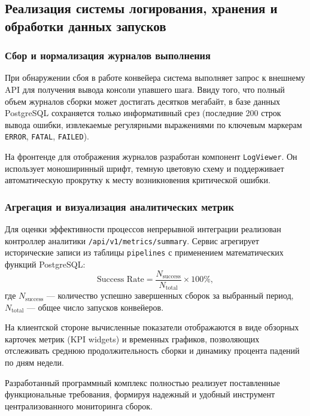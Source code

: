 \subsection{Реализация системы логирования, хранения и обработки данных запусков}

\subsubsection{Сбор и нормализация журналов выполнения}
При обнаружении сбоя в работе конвейера система выполняет запрос к внешнему API для получения вывода консоли упавшего шага. Ввиду того, что полный объем журналов сборки может достигать десятков мегабайт, в базе данных PostgreSQL сохраняется только информативный срез (последние 200 строк вывода ошибки, извлекаемые регулярными выражениями по ключевым маркерам \texttt{ERROR}, \texttt{FATAL}, \texttt{FAILED}).

На фронтенде для отображения журналов разработан компонент \texttt{LogViewer}. Он использует моноширинный шрифт, темную цветовую схему и поддерживает автоматическую прокрутку к месту возникновения критической ошибки.

\subsubsection{Агрегация и визуализация аналитических метрик}
Для оценки эффективности процессов непрерывной интеграции реализован контроллер аналитики \texttt{/api/v1/metrics/summary}. Сервис агрегирует исторические записи из таблицы \texttt{pipelines} с применением математических функций PostgreSQL:
\begin{equation}
    \text{Success Rate} = \frac{N_{\text{success}}}{N_{\text{total}}} \times 100\%,
\end{equation}
где $N_{\text{success}}$ --- количество успешно завершенных сборок за выбранный период, $N_{\text{total}}$ --- общее число запусков конвейеров.

На клиентской стороне вычисленные показатели отображаются в виде обзорных карточек метрик (KPI widgets) и временных графиков, позволяющих отслеживать среднюю продолжительность сборки и динамику процента падений по дням недели.

Разработанный программный комплекс полностью реализует поставленные функциональные требования, формируя надежный и удобный инструмент централизованного мониторинга сборок.